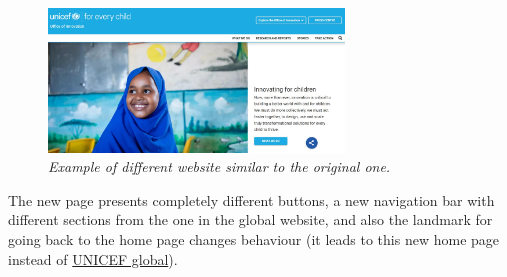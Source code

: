 \begin{figure}[!h]
	\begin{center}
		\includegraphics[width=0.7\textwidth]{FinalScores3.jpg}
		\captionsetup{font=small}
		\caption{\textit{Example of different website similar to the original one.}}
	\end{center}
\end{figure}
The new page presents completely different buttons, a new navigation bar with different sections from the one in the global website, and also the landmark for going back to the home page changes behaviour (it leads to this new home page instead of \href{https://www.unicef.org/}{UNICEF global}).













